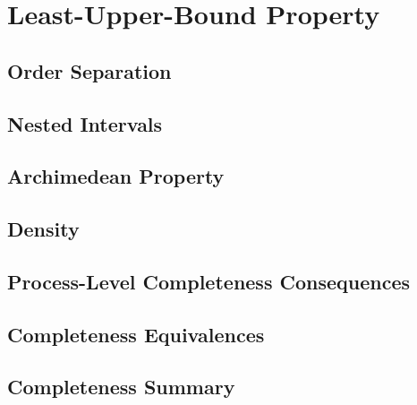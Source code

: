 \section{Least-Upper-Bound Property}


\subsection{Order Separation}


\subsection{Nested Intervals}


\subsection{Archimedean Property}


\subsection{Density}


\subsection{Process-Level Completeness Consequences}


\subsection{Completeness Equivalences}


\subsection{Completeness Summary}

